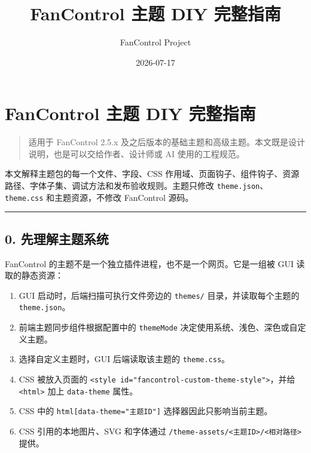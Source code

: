 \documentclass[UTF8,11pt,a4paper]{ctexart}
\title{FanControl 主题 DIY 完整指南}
\author{FanControl Project}
\date{2026-07-17}
\providecommand{\tightlist}{%
  \setlength{\itemsep}{0pt}\setlength{\parskip}{0pt}}
\begin{document}
\maketitle

{
\setcounter{tocdepth}{3}
\tableofcontents
}
\section{FanControl 主题 DIY
完整指南}\label{fancontrol-ux4e3bux9898-diy-ux5b8cux6574ux6307ux5357}

\begin{quote}
适用于 FanControl 2.5.x
及之后版本的基础主题和高级主题。本文既是设计说明，也是可以交给作者、设计师或
AI 使用的工程规范。
\end{quote}

本文解释主题包的每一个文件、字段、CSS
作用域、页面钩子、组件钩子、资源路径、字体子集、调试方法和发布验收规则。主题只修改
\texttt{theme.json}、\texttt{theme.css} 和主题资源，不修改 FanControl
源码。

\begin{center}\rule{0.5\linewidth}{0.5pt}\end{center}

\subsection{0.
先理解主题系统}\label{0-ux5148ux7406ux89e3ux4e3bux9898ux7cfbux7edf}

FanControl 的主题不是一个独立插件进程，也不是一个网页。它是一组被 GUI
读取的静态资源：

\begin{enumerate}
\def\labelenumi{\arabic{enumi}.}
\tightlist
\item
  GUI 启动时，后端扫描可执行文件旁边的 \texttt{themes/}
  目录，并读取每个主题的 \texttt{theme.json}。
\item
  前端主题同步组件根据配置中的 \texttt{themeMode}
  决定使用系统、浅色、深色或自定义主题。
\item
  选择自定义主题时，GUI 后端读取该主题的 \texttt{theme.css}。
\item
  CSS 被放入页面的
\texttt{\textless{}style\ id="fancontrol-custom-theme-style"\textgreater{}}，并给
  \texttt{\textless{}html\textgreater{}} 加上 \texttt{data-theme} 属性。
\item
  CSS 中的 \texttt{html{[}data-theme="主题ID"{]}}
  选择器因此只影响当前主题。
\item
  CSS 引用的本地图片、SVG 和字体通过
  \texttt{/theme-assets/\textless{}主题ID\textgreater{}/\textless{}相对路径\textgreater{}}
  提供。
\end{enumerate}
\end{document}
